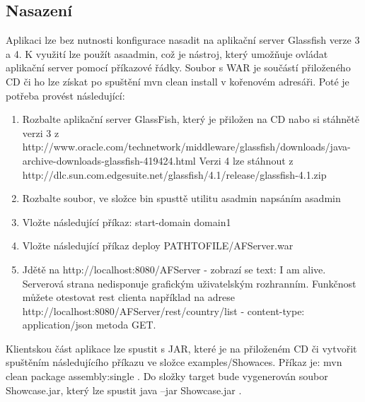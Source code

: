 \subsection{Nasazení}
Aplikaci lze bez nutnosti konfigurace nasadit na aplikační server Glassfish verze 3 a 4. K využití lze použít asaadmin, což je nástroj, který umožňuje ovládat aplikační server pomocí příkazové řádky. Soubor s WAR je součástí přiloženého CD či ho lze získat po spuštění mvn clean install v kořenovém adresáři. Poté je potřeba provést následující:
\begin{enumerate}
\item Rozbalte aplikační server GlassFish, který je přiložen na CD nabo si stáhnětě verzi 3 z http://www.oracle.com/technetwork/middleware/glassfish/downloads/java-archive-downloads-glassfish-419424.html Verzi 4 lze stáhnout z \\http://dlc.sun.com.edgesuite.net/glassfish/4.1/release/glassfish-4.1.zip
\item Rozbalte soubor, ve složce bin spusttě utilitu asadmin napsáním asadmin
\item Vložte následující příkaz: start-domain domain1
\item Vložte následující příkaz deploy PATHTOFILE/AFServer.war
\item Jdětě na http://localhost:8080/AFServer - zobrazí se text: I am alive. Serverová strana nedisponuje grafickým uživatelským rozhranním. Funkčnost můžete otestovat rest clienta například na adrese http://localhost:8080/AFServer/rest/country/list - content-type: application/json metoda GET.
\end{enumerate}
Klientskou část aplikace lze spustit s JAR, které je na přiloženém CD či vytvořit spuštěním následujícího příkazu ve složce examples/Showaces. Příkaz je: mvn clean package assembly:single . Do složky target bude vygenerován soubor Showcase.jar, který lze spustit java –jar Showcase.jar . 
